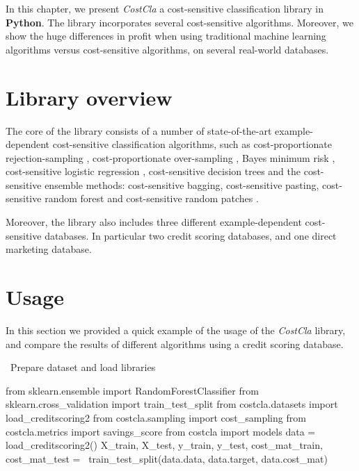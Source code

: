 In this chapter, we present \textit{CostCla} a cost-sensitive classification library in 
\textbf{Python}. The library incorporates several cost-sensitive algorithms. Moreover, we show 
the huge differences in profit when using traditional machine learning algorithms versus 
cost-sensitive algorithms, on several real-world databases.

\section{Library overview}

The core of the library consists of a number of state-of-the-art example-dependent cost-sensitive 
classification algorithms, such as cost-proportionate rejection-sampling \citep{Zadrozny2003}, 
cost-proportionate over-sampling \citep{Elkan2001}, Bayes minimum risk 
\citep{CorreaBahnsen2013,CorreaBahnsen2014}, cost-sensitive logistic regression 
\citep{CorreaBahnsen2014b}, cost-sensitive decision trees \citep{CorreaBahnsen2015} and the 
cost-sensitive ensemble methods: cost-sensitive bagging, cost-sensitive pasting, cost-sensitive 
random forest and cost-sensitive random patches \citep{CorreaBahnsen2015b}.

Moreover, the library also includes three different example-dependent cost-sensitive databases. In 
particular two credit scoring databases, and one direct marketing database.

\section{Usage}

In this section we provided a quick example of the usage of the \textit{CostCla}  library, and 
compare the results of different algorithms using a credit scoring database.

\vskip0.3cm
\noindent \textbullet\ Prepare dataset and load libraries

\vskip0.3cm
\begin{pythoncode}
from sklearn.ensemble import RandomForestClassifier
from sklearn.cross_validation import train_test_split
from costcla.datasets import load_creditscoring2
from costcla.sampling import cost_sampling
from costcla.metrics import savings_score
from costcla import models
data = load_creditscoring2()
X_train, X_test, y_train, y_test, 
cost_mat_train, cost_mat_test = \
train_test_split(data.data, data.target, data.cost_mat)
\end{pythoncode}

